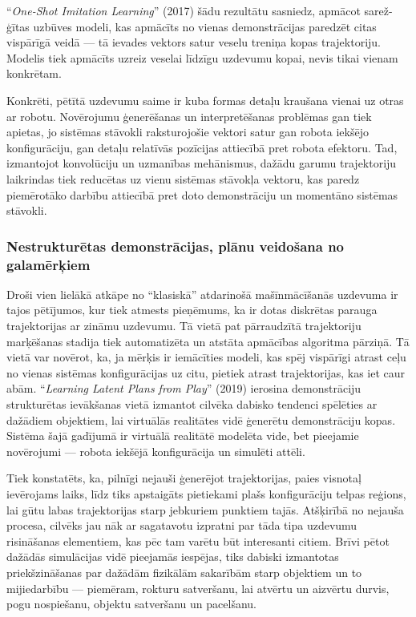 \documentclass[12pt, a4paper]{article}
\numberwithin{equation}{section} %
\begin{document}
``\textit{One-Shot Imitation Learning}'' \cite{duan2017one} (2017) šādu rezultātu sasniedz, apmācot sarež-ģītas uzbūves modeli, kas apmācīts no vienas demonstrācijas paredzēt citas vispārīgā veidā --- tā ievades vektors satur veselu treniņa kopas trajektoriju. Modelis tiek apmācīts uzreiz veselai līdzīgu uzdevumu kopai, nevis tikai vienam konkrētam.

Konkrēti, pētītā uzdevumu saime ir kuba formas detaļu kraušana vienai uz otras ar robotu. Novērojumu ģenerēšanas un interpretēšanas problēmas gan tiek apietas, jo sistēmas stāvokli raksturojošie vektori satur gan robota iekšējo konfigurāciju, gan detaļu relatīvās pozīcijas attiecībā pret robota efektoru. Tad, izmantojot konvolūciju un uzmanības mehānismus, dažādu garumu trajektoriju laikrindas tiek reducētas uz vienu sistēmas stāvokļa vektoru, kas paredz piemērotāko darbību attiecībā pret doto demonstrāciju un momentāno sistēmas stāvokli.

\subsubsection{Nestrukturētas demonstrācijas, plānu veidošana no galamērķiem}

Droši vien lielākā atkāpe no ``klasiskā'' atdarinošā mašīnmācīšanās uzdevuma ir tajos pētījumos, kur tiek atmests pieņēmums, ka ir dotas diskrētas parauga trajektorijas ar zināmu uzdevumu. Tā vietā pat pārraudzītā trajektoriju marķēšanas stadija tiek automatizēta un atstāta apmācības algoritma pārziņā. Tā vietā var novērot, ka, ja mērķis ir iemācīties modeli, kas spēj vispārīgi atrast ceļu no vienas sistēmas konfigurācijas uz citu, pietiek atrast trajektorijas, kas iet caur abām. ``\textit{Learning Latent Plans from Play}'' \cite{lynch2020learning} (2019) ierosina demonstrāciju strukturētas ievākšanas vietā izmantot cilvēka dabisko tendenci spēlēties ar dažādiem objektiem, lai virtuālās realitātes vidē ģenerētu demonstrāciju kopas. Sistēma šajā gadījumā ir virtuālā realitātē modelēta vide, bet pieejamie novērojumi --- robota iekšējā konfigurācija un simulēti attēli.

Tiek konstatēts, ka, pilnīgi nejauši ģenerējot trajektorijas, paies visnotaļ ievērojams laiks, līdz tiks apstaigāts pietiekami plašs konfigurāciju telpas reģions, lai gūtu labas trajektorijas starp jebkuriem punktiem tajās. Atšķirībā no nejauša procesa, cilvēks jau nāk ar sagatavotu izpratni par tāda tipa uzdevumu risināšanas elementiem, kas pēc tam varētu būt interesanti citiem. Brīvi pētot dažādās simulācijas vidē pieejamās iespējas, tiks dabiski izmantotas priekšzināšanas par dažādām fizikālām sakarībām starp objektiem un to mijiedarbību --- piemēram, rokturu satveršanu, lai atvērtu un aizvērtu durvis, pogu nospiešanu, objektu satveršanu un pacelšanu.
\end{document}
